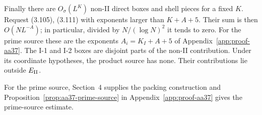 Finally there are $O_\sigma(L^K)$ non-II direct boxes and shell
pieces for a fixed $K$. Request (3.105), (3.111) with exponents
larger than $K+A+5$. Their sum is then $O(NL^{-A})$; in particular,
divided by $N/(\log N)^2$ it tends to zero. For the prime source these
are the exponents $A_i=K_I+A+5$ of Appendix~\ref{app:proof-aa37}.
The I-1 and I-2 boxes are disjoint parts of the non-II contribution.
Under its coordinate hypotheses, the product source has none.
Their contributions lie outside $E_{\rm II}$.

For the prime source, Section~4 supplies the packing construction and
Proposition~\ref{prop:aa37-prime-source} in Appendix~\ref{app:proof-aa37}
gives the prime-source estimate.

